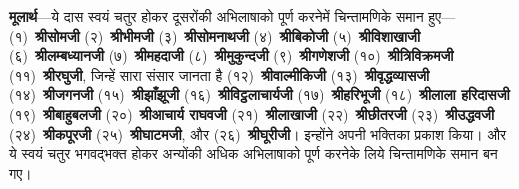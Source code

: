 \begin{sloppypar}\justifying{}
\textbf{मूलार्थ}—ये दास स्वयं चतुर होकर दूसरोंकी अभिलाषाको पूर्ण करनेमें चिन्तामणिके समान हुए—(१)~\textbf{श्रीसोमजी} (२)~\textbf{श्रीभीमजी} (३)~\textbf{श्रीसोमनाथजी} (४)~\textbf{श्रीबिकोजी} (५)~\textbf{श्रीविशाखाजी} (६)~\textbf{श्रीलम्बध्यानजी} (७)~\textbf{श्रीमहदाजी} (८)~\textbf{श्रीमुकुन्दजी} (९)~\textbf{श्रीगणेशजी} (१०)~\textbf{श्रीत्रिविक्रमजी} (११)~\textbf{श्रीरघुजी}, जिन्हें सारा संसार जानता है (१२)~\textbf{श्रीवाल्मीकिजी} (१३)~\textbf{श्रीवृद्धव्यासजी} (१४)~\textbf{श्रीजगनजी} (१५)~\textbf{श्रीझाँझूजी} (१६)~\textbf{श्रीविट्ठलाचार्यजी} (१७)~\textbf{श्रीहरिभूजी} (१८)~\textbf{श्रीलाला हरिदासजी} (१९)~\textbf{श्रीबाहुबलजी} (२०)~\textbf{श्रीआचार्य राघवजी} (२१)~\textbf{श्रीलाखाजी} (२२)~\textbf{श्रीछीतरजी} (२३)~\textbf{श्रीउद्धवजी} (२४)~\textbf{श्रीकपूरजी} (२५)~\textbf{श्रीघाटमजी}, और (२६)~\textbf{श्रीघूरीजी}। इन्होंने अपनी भक्तिका प्रकाश किया। और ये स्वयं चतुर भगवद्भक्त होकर अन्योंकी अधिक अभिलाषाको पूर्ण करनेके लिये चिन्तामणिके समान बन गए।
\end{sloppypar}


